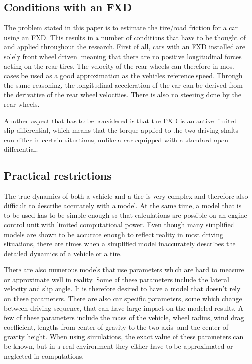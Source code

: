 \subsection{Conditions with an FXD}

The problem stated in this paper is to estimate the tire/road friction for a car using an FXD. This results in a number of conditions that have to be thought of and applied throughout the research. First of all, cars with an FXD installed are solely front wheel driven, meaning that there are no positive longitudinal forces acting on the rear tires. The velocity of the rear wheels can therefore in most cases be used as a good approximation as the vehicles reference speed. Through the same reasoning, the longitudinal acceleration of the car can be derived from the derivative of the rear wheel velocities. There is also no steering done by the rear wheels.

Another aspect that has to be considered is that the FXD is an active limited slip differential, which means that the torque applied to the two driving shafts can differ in certain situations, unlike a car equipped with a standard open differential.

\subsection{Practical restrictions}

The true dynamics of both a vehicle and a tire is very complex and therefore also difficult to describe accurately with a model. At the same time, a model that is to be used has to be simple enough so that calculations are possible on an engine control unit with limited computational power. Even though many simplified models are shown to be accurate enough to reflect reality in most driving situations, there are times when a simplified model inaccurately describes the detailed dynamics of a vehicle or a tire. 

There are also numerous models that use parameters which are hard to measure or approximate well in reality. Some of these parameters include the lateral velocity and slip angle. It is therefore desired to have a model that doesn't rely on these parameters. There are also car specific parameters, some which change between driving sequence, that can have large impact on the modeled results. A few of these parameters include the mass of the vehicle, wheel radius, wind drag coefficient, lengths from center of gravity to the two axis, and the center of gravity height. When using simulations, the exact value of these parameters can be known, but in a real environment they either have to be approximated or neglected in computations.

